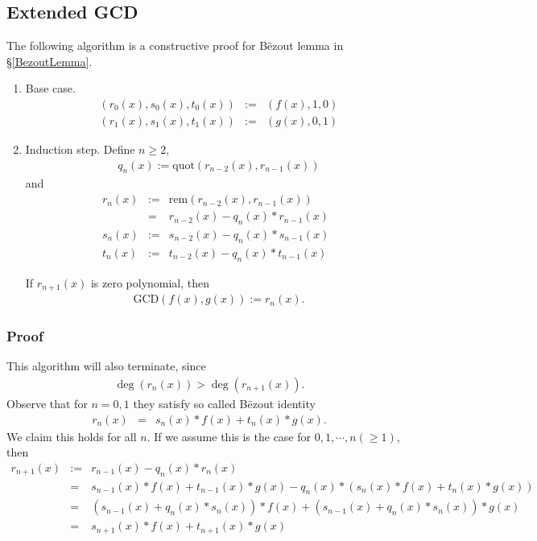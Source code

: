 \documentclass[11pt]{book}
\begin{document}
\subsection{Extended GCD}
The following algorithm is a constructive proof for B\"ezout lemma in \S\ref{BezoutLemma}.
\begin{enumerate}
\item Base case.
\begin{eqnarray}
\left( r_0(x), s_0(x), t_0(x) \right) &:=& \left( f(x), 1, 0\right) \\
\left( r_1(x), s_1(x), t_1(x) \right) &:=& \left( g(x), 0, 1\right)
\end{eqnarray}

\item Induction step.
Define $n \geq 2$,
\begin{eqnarray}
q_n(x) := \text{quot}\left( r_{n-2}(x), r_{n-1}(x) \right)
\end{eqnarray}
and
\begin{eqnarray}
r_n(x) &:=& \text{rem}\left( r_{n-2}(x), r_{n-1}(x) \right) \qquad \\
&=& r_{n-2}(x) - q_n(x) * r_{n-1}(x) \\
s_n(x) &:=& s_{n-2}(x) - q_n(x) * s_{n-1}(x) \\
t_n(x) &:=& t_{n-2}(x) - q_n(x) * t_{n-1}(x) 
\end{eqnarray}

If $r_{n+1}(x)$ is zero polynomial, then
\begin{eqnarray}
\text{GCD}\left( f(x), g(x) \right) := r_n(x).
\end{eqnarray}

\end{enumerate}

\subsubsection{Proof}
This algorithm will also terminate, since
\begin{eqnarray}
\deg\left(r_n(x) \right) > \deg\left(r_{n+1}(x) \right).
\end{eqnarray}
Observe that for $n=0,1$ they satisfy so called B\"ezout identity
\begin{eqnarray}
r_n(x) &=& s_n(x) * f(x) + t_n(x) * g(x).
\end{eqnarray}
We claim this holds for all $n$.
If we assume this is the case for $0,1, \cdots, n(\geq 1)$, then
\begin{eqnarray}
r_{n+1}(x)
&:=& r_{n-1}(x) - q_n(x) * r_{n}(x) \\
&=& s_{n-1}(x) * f(x) + t_{n-1}(x) * g(x) - q_n(x) * \left( s_n(x) * f(x) + t_n(x) * g(x) \right) \qquad \qquad \\
&=& \left( s_{n-1}(x) + q_n(x) * s_n(x) \right) * f(x) + \left( s_{n-1}(x) + q_n(x) * s_n(x) \right) * g(x) \\
&=& s_{n+1}(x) * f(x) + t_{n+1}(x) * g(x)
\end{eqnarray}
\end{document}
